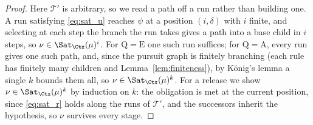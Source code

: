 \begin{proof}
\textit{} Here $\mathcal{T}'$ is arbitrary, so we read a path off a run rather than
building one. A run satisfying \eqref{eq:sat_u} reaches $\psi$ at a position $(i,\delta)$ with
$i$ finite, and selecting at each step the branch the run takes gives a path into a base child
in $i$ steps, so $\nu\in \Sat_{\Ctx}(\mu)^{i}$. For $\mathrm{Q}=\mathrm{E}$ one such run suffices; for
$\mathrm{Q}=\mathrm{A}$, every run gives one such path, and, since the pursuit graph is finitely branching (each rule has finitely many children and Lemma~\ref{lem:finiteness}), by K\"onig's lemma a single $k$ bounds them all, so $\nu\in \Sat_{\Ctx}(\mu)^{k}$. For a release we show $\nu\in \Sat_{\Ctx}(\mu)^{k}$ by induction
on $k$: the obligation is met at the current position, since \eqref{eq:sat_r} holds along the
runs of $\mathcal{T}'$, and the successors inherit the hypothesis, so $\nu$ survives every
stage.

\end{proof}


